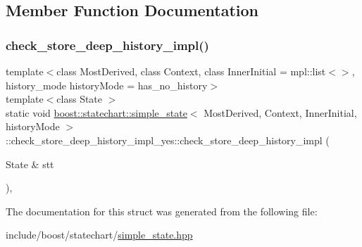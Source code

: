 \subsection{Member Function Documentation}
\mbox{\label{structboost_1_1statechart_1_1simple__state_1_1check__store__deep__history__impl__yes_a627a06819055eb5f3888c5a69c8b916f}} 
\subsubsection{\texorpdfstring{check\+\_\+store\+\_\+deep\+\_\+history\+\_\+impl()}{check\_store\_deep\_history\_impl()}}
{\footnotesize\ttfamily template$<$class Most\+Derived, class Context, class Inner\+Initial = mpl\+::list$<$$>$, history\+\_\+mode history\+Mode = has\+\_\+no\+\_\+history$>$ \\
template$<$class State $>$ \\
static void \mbox{\hyperlink{classboost_1_1statechart_1_1simple__state}{boost\+::statechart\+::simple\+\_\+state}}$<$ Most\+Derived, Context, Inner\+Initial, history\+Mode $>$\+::check\+\_\+store\+\_\+deep\+\_\+history\+\_\+impl\+\_\+yes\+::check\+\_\+store\+\_\+deep\+\_\+history\+\_\+impl (\begin{DoxyParamCaption}\item[{State \&}]{stt }\end{DoxyParamCaption})\hspace{0.3cm}{\ttfamily [inline]}, {\ttfamily [static]}}



The documentation for this struct was generated from the following file\+:\begin{DoxyCompactItemize}
\item 
include/boost/statechart/\mbox{\hyperlink{simple__state_8hpp}{simple\+\_\+state.\+hpp}}\end{DoxyCompactItemize}
